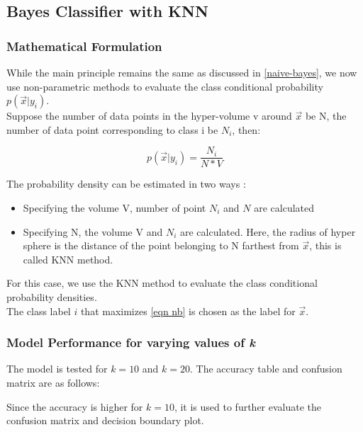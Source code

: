 \documentclass[11pt,a4paper]{article}
\newcommand{\noi}{\noindent}
\begin{document}
\subsection{Bayes Classifier with KNN}
\subsubsection{Mathematical Formulation}
While the main principle remains the same as discussed in \autoref{naive-bayes}, we now use non-parametric methods to evaluate the class conditional probability $p(\vec{x}|y_{i})$.\\

\noi
Suppose the number of data points in the hyper-volume v around $\vec{x}$ be N, the number of data point corresponding to class i be $N_i$, then:

\begin{equation}
    p(\vec{x}|y_{i})=\frac{N_{i}}{N*V}
\end{equation}

The probability density can be estimated in two ways :
\begin{itemize}
    \itemsep0em
    \item Specifying the volume V, number of point $N_i$ and $N$ are calculated
    \item Specifying N, the volume V and $N_i$ are calculated. Here, the radius of hyper sphere is the distance of the point belonging to N farthest from $\vec{x}$, this is called KNN method.  
\end{itemize}

\noi
For this case, we use the KNN method to evaluate the class conditional probability densities.\\
The class label $i$ that maximizes \autoref{eqn nb} is chosen as the label for $\vec{x}$. 

\subsubsection{Model Performance for varying values of \textit{k}}
The model is tested for $k=10$ and $k=20$. The accuracy table and confusion matrix are as follows:


\noi
Since the accuracy is higher for $k=10$, it is used to further evaluate the confusion matrix and decision boundary plot. 
\end{document}
